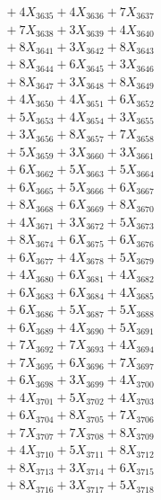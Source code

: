 \documentclass[a4paper,10pt]{article}
\begin{document}
{\begin{align}
&\;  + 4 X_{3635} + 4 X_{3636} + 7 X_{3637} \\[0.3ex]
&\;  + 7 X_{3638} + 3 X_{3639} + 4 X_{3640} \\[0.5ex]\allowbreak
&\;  + 8 X_{3641} + 3 X_{3642} + 8 X_{3643} \\[0.3ex]
&\;  + 8 X_{3644} + 6 X_{3645} + 3 X_{3646} \\[0.3ex]
&\;  + 8 X_{3647} + 3 X_{3648} + 8 X_{3649} \\[0.3ex]
&\;  + 4 X_{3650} + 4 X_{3651} + 6 X_{3652} \\[0.3ex]
&\;  + 5 X_{3653} + 4 X_{3654} + 3 X_{3655} \\[0.3ex]
&\;  + 3 X_{3656} + 8 X_{3657} + 7 X_{3658} \\[0.3ex]
&\;  + 5 X_{3659} + 3 X_{3660} + 3 X_{3661} \\[0.3ex]
&\;  + 6 X_{3662} + 5 X_{3663} + 5 X_{3664} \\[0.3ex]
&\;  + 6 X_{3665} + 5 X_{3666} + 6 X_{3667} \\[0.3ex]
&\;  + 8 X_{3668} + 6 X_{3669} + 8 X_{3670} \\[0.5ex]\allowbreak
&\;  + 4 X_{3671} + 3 X_{3672} + 5 X_{3673} \\[0.3ex]
&\;  + 8 X_{3674} + 6 X_{3675} + 6 X_{3676} \\[0.3ex]
&\;  + 6 X_{3677} + 4 X_{3678} + 5 X_{3679} \\[0.3ex]
&\;  + 4 X_{3680} + 6 X_{3681} + 4 X_{3682} \\[0.3ex]
&\;  + 6 X_{3683} + 6 X_{3684} + 4 X_{3685} \\[0.3ex]
&\;  + 6 X_{3686} + 5 X_{3687} + 5 X_{3688} \\[0.3ex]
&\;  + 6 X_{3689} + 4 X_{3690} + 5 X_{3691} \\[0.3ex]
&\;  + 7 X_{3692} + 7 X_{3693} + 4 X_{3694} \\[0.3ex]
&\;  + 7 X_{3695} + 6 X_{3696} + 7 X_{3697} \\[0.3ex]
&\;  + 6 X_{3698} + 3 X_{3699} + 4 X_{3700} \\[0.5ex]\allowbreak
&\;  + 4 X_{3701} + 5 X_{3702} + 4 X_{3703} \\[0.3ex]
&\;  + 6 X_{3704} + 8 X_{3705} + 7 X_{3706} \\[0.3ex]
&\;  + 7 X_{3707} + 7 X_{3708} + 8 X_{3709} \\[0.3ex]
&\;  + 4 X_{3710} + 5 X_{3711} + 8 X_{3712} \\[0.3ex]
&\;  + 8 X_{3713} + 3 X_{3714} + 6 X_{3715} \\[0.3ex]
&\;  + 8 X_{3716} + 3 X_{3717} + 5 X_{3718} \\[0.3ex]

\end{align}}
\end{document}
